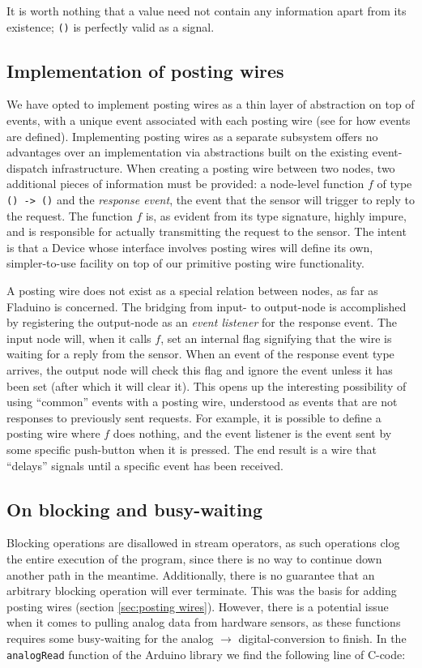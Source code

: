 \documentclass[a4paper, oneside, final]{memoir}
\let\Fref\undefined
\begin{document}
It is worth nothing that a value need not contain any information
apart from its existence; \texttt{()} is perfectly valid as a signal.

\subsection{Implementation of posting wires}
\label{sec:postingwireimpl}
We have opted to implement posting wires as a thin layer of
abstraction on top of events, with a unique event associated with each
posting wire (see \Fref{sec:definingevents} for how events are
defined).  Implementing posting wires as a separate subsystem offers
no advantages over an implementation via abstractions built on the
existing event-dispatch infrastructure.  When creating a posting wire
between two nodes, two additional pieces of information must be
provided: a node-level function $f$ of type \texttt{() -> ()} and the
\textit{response event}, the event that the sensor will trigger to
reply to the request.  The function $f$ is, as evident from its type
signature, highly impure, and is responsible for actually transmitting
the request to the sensor.  The intent is that a Device whose
interface involves posting wires will define its own, simpler-to-use
facility on top of our primitive posting wire functionality.

A posting wire does not exist as a special relation between nodes, as
far as Fladuino is concerned.  The bridging from input- to output-node
is accomplished by registering the output-node as an \textit{event
  listener} for the response event.  The input node will, when it
calls $f$, set an internal flag signifying that the wire is waiting
for a reply from the sensor.  When an event of the response event type
arrives, the output node will check this flag and ignore the event
unless it has been set (after which it will clear it).  This opens up
the interesting possibility of using ``common'' events with a posting
wire, understood as events that are not responses to previously sent
requests.  For example, it is possible to define a posting wire where
$f$ does nothing, and the event listener is the event sent by some
specific push-button when it is pressed.  The end result is a wire
that ``delays'' signals until a specific event has been received.

\subsection{On blocking and busy-waiting}
Blocking operations are disallowed in stream operators, as such
operations clog the entire execution of the program, since there is no
way to continue down another path in the meantime.  Additionally,
there is no guarantee that an arbitrary blocking operation will ever
terminate.  This was the basis for adding posting wires (section
\ref{sec:posting wires}). However, there is a potential issue when it
comes to pulling analog data from hardware sensors, as these functions
requires some busy-waiting for the analog $\rightarrow$
digital-conversion to finish.  In the \texttt{analogRead} function of
the Arduino library we find the following line of C-code:
\end{document}

